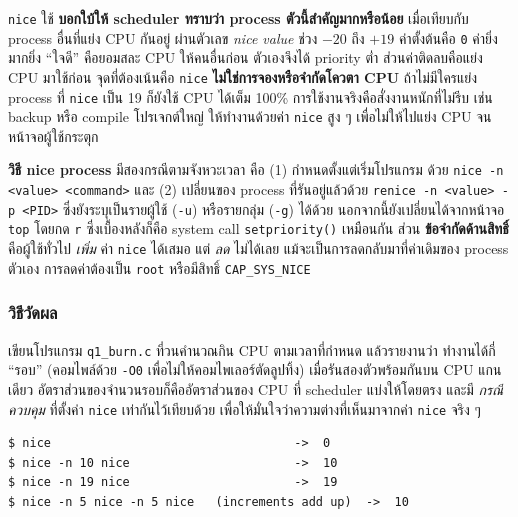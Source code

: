 \documentclass[a4paper,11pt]{article}
\newcommand{\code}[1]{\texttt{#1}}
\begin{document}
\code{nice} ใช้ \textbf{บอกใบ้ให้ scheduler ทราบว่า process ตัวนี้สำคัญมากหรือน้อย}
เมื่อเทียบกับ process อื่นที่แย่ง CPU กันอยู่ ผ่านตัวเลข \emph{nice value}
ช่วง $-20$ ถึง $+19$ ค่าตั้งต้นคือ \code{0} ค่ายิ่งมากยิ่ง ``ใจดี'' คือยอมสละ CPU
ให้คนอื่นก่อน ตัวเองจึงได้ priority ต่ำ ส่วนค่าติดลบคือแย่ง CPU มาใช้ก่อน
จุดที่ต้องเน้นคือ \code{nice} \textbf{ไม่ใช่การจองหรือจำกัดโควตา CPU}
ถ้าไม่มีใครแย่ง process ที่ \code{nice} เป็น 19 ก็ยังใช้ CPU ได้เต็ม 100\%
การใช้งานจริงคือสั่งงานหนักที่ไม่รีบ เช่น backup หรือ compile โปรเจกต์ใหญ่
ให้ทำงานด้วยค่า \code{nice} สูง ๆ เพื่อไม่ให้ไปแย่ง CPU จนหน้าจอผู้ใช้กระตุก

\textbf{วิธี nice process} มีสองกรณีตามจังหวะเวลา คือ (1) กำหนดตั้งแต่เริ่มโปรแกรม
ด้วย \code{nice -n <value> <command>} และ (2) เปลี่ยนของ process ที่รันอยู่แล้วด้วย
\code{renice -n <value> -p <PID>} ซึ่งยังระบุเป็นรายผู้ใช้ (\code{-u}) หรือรายกลุ่ม
(\code{-g}) ได้ด้วย นอกจากนี้ยังเปลี่ยนได้จากหน้าจอ \code{top} โดยกด \code{r}
ซึ่งเบื้องหลังก็คือ system call \code{setpriority()} เหมือนกัน
ส่วน \textbf{ข้อจำกัดด้านสิทธิ์} คือผู้ใช้ทั่วไป \emph{เพิ่ม} ค่า \code{nice}
ได้เสมอ แต่ \emph{ลด} ไม่ได้เลย แม้จะเป็นการลดกลับมาที่ค่าเดิมของ process ตัวเอง
การลดค่าต้องเป็น \code{root} หรือมีสิทธิ์ \code{CAP\_SYS\_NICE}

\subsubsection{วิธีวัดผล}

เขียนโปรแกรม \code{q1\_burn.c} ที่วนคำนวณกิน CPU ตามเวลาที่กำหนด แล้วรายงานว่า
ทำงานได้กี่ ``รอบ'' (คอมไพล์ด้วย \code{-O0} เพื่อไม่ให้คอมไพเลอร์ตัดลูปทิ้ง)
เมื่อรันสองตัวพร้อมกันบน CPU แกนเดียว อัตราส่วนของจำนวนรอบก็คืออัตราส่วนของ CPU
ที่ scheduler แบ่งให้โดยตรง และมี \emph{กรณีควบคุม} ที่ตั้งค่า \code{nice}
เท่ากันไว้เทียบด้วย เพื่อให้มั่นใจว่าความต่างที่เห็นมาจากค่า \code{nice} จริง ๆ

\begin{lstlisting}[style=terminal,caption={ค่า nice ตั้งต้น และการที่ \code{nice} เป็นการเพิ่มค่าสะสม ไม่ใช่กำหนดค่าตายตัว}]
$ nice                                  ->  0
$ nice -n 10 nice                       ->  10
$ nice -n 19 nice                       ->  19
$ nice -n 5 nice -n 5 nice   (increments add up)  ->  10
\end{lstlisting}
\end{document}
